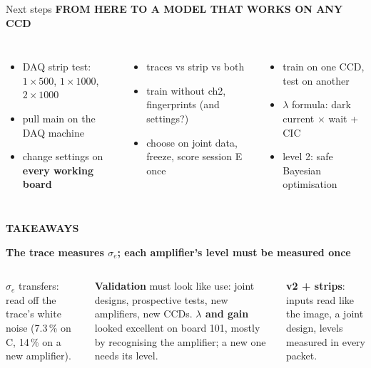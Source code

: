 \documentclass[aspectratio=169,11pt]{beamer}
\newcommand{\eyebrow}[2][trace]{{\color{#1}\scriptsize\bfseries\MakeUppercase{#2}}\par\vspace{0.2em}}
\begin{document}
\begin{frame}{Next steps}
\eyebrow{From here to a model that works on any CCD}
\begin{columns}[T]
\begin{itemize}\footnotesize
\item DAQ strip test: $1\times500$, $1\times1000$, $2\times1000$
\item pull main on the DAQ machine
\item change settings on \textbf{every working board}
\end{itemize}
\begin{itemize}\footnotesize
\item traces vs strip vs both
\item train without ch2, fingerprints (and settings?)
\item choose on joint data, freeze, score session E once
\end{itemize}
\begin{itemize}\footnotesize
\item train on one CCD, test on another
\item $\lambda$ formula: dark current $\times$ wait + CIC
\item level 2: safe Bayesian optimisation
\end{itemize}
\end{columns}
\end{frame}

{
\begin{frame}[plain]
{\color{paper!80}\small\bfseries TAKEAWAYS}\par\vspace{0.6em}
{\color{paper}\Large\bfseries The trace measures $\sigma_e$; each amplifier's level must be measured once}\par\vspace{1.2em}
\color{paper}
\begin{columns}[T]
\small
\textbf{$\sigma_e$} transfers: read off the trace's white noise (7.3\,\% on C, 14\,\% on a new amplifier).\par\medskip
\textbf{Validation} must look like use: joint designs, prospective tests, new amplifiers, new CCDs.
\small
\textbf{$\lambda$ and gain} looked excellent on board 101, mostly by recognising the amplifier; a new one needs its level.\par\medskip
\textbf{v2 + strips}: inputs read like the image, a joint design, levels measured in every packet.
\end{columns}
\end{frame}}
\end{document}
